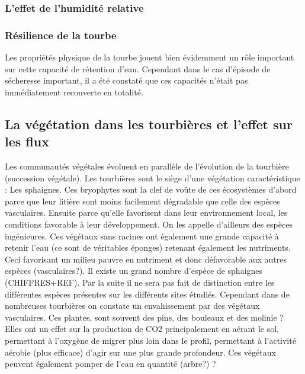 \subsubsection{L'effet de l'humidité relative}

\subsubsection{Résilience de la tourbe}
Les propriétés physique de la tourbe jouent bien évidemment un rôle important sur cette capacité de rétention d'eau.
Cependant dans le cas d'épisode de sécheresse important, il a été constaté que ces capacités n'était pas immédiatement recouverte en totalité.


\subsection{La végétation dans les tourbières et l'effet sur les flux}
Les communautés végétales évoluent en parallèle de l'évolution de la tourbière (succession végétale).
Les tourbières sont le siège d'une végétation caractéristique : Les sphaignes.
Ces bryophytes sont la clef de voûte de ces écosystèmes d'abord parce que leur litière sont moins facilement dégradable que celle des espèces vasculaires.
Ensuite parce qu'elle favorisent dans leur environnement local, les conditions favorable à leur développement. 
On les appelle d'ailleurs des espèces ingénieures.
Ces végétaux sans racines ont également une grande capacité à retenir l'eau (ce sont de véritables éponges) retenant également les nutriments. 
Ceci favorisant un milieu pauvre en nutriment et donc défavorable aux autres espèces (vasculaires?).
Il existe un grand nombre d'espèce de sphaignes (CHIFFRES+REF).
Par la suite il ne sera pas fait de distinction entre les différentes espèces présentes sur les différents sites étudiés.
Cependant dans de nombreuses tourbières on constate un envahissement par des végétaux vasculaires.
Ces plantes, sont souvent des pins, des bouleaux et des molinie ?
Elles ont un effet sur la production de CO2 principalement en aérant le sol, permettant à l'oxygène de migrer plus loin dans le profil, permettant à l'activité aérobie (plus efficace) d'agir sur une plus grande profondeur.
Ces végétaux peuvent également pomper de l'eau en quantité (arbre?) ?





